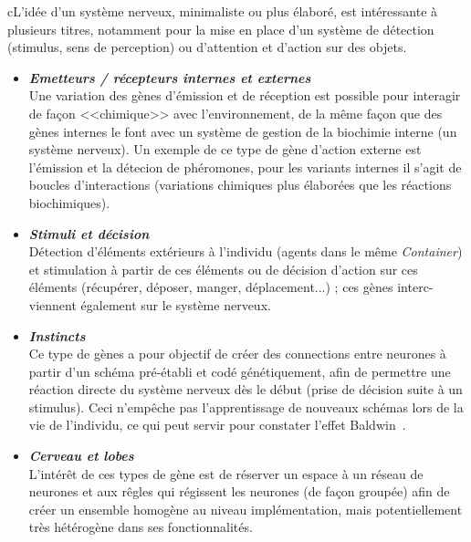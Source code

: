 \documentclass[11pt,twoside,a4paper]{article}
\begin{document}
cL'id{\'e}e d'un syst{\`e}me nerveux, minimaliste ou plus {\'e}labor{\'e}, est int{\'e}ressante {\`a} plusieurs titres, notamment pour la mise en place d'un syst{\`e}me de d{\'e}tection (stimulus, sens de perception) ou d'attention et d'action sur des objets. 
	\begin{itemize}
		\item \textbf{\emph{Emetteurs / r{\'e}cepteurs internes et externes}}~\\
Une variation des g{\`e}nes d'{\'e}mission et de r{\'e}ception est possible pour interagir de fa\c{c}on <<chimique>> avec l'environnement, de la m{\^e}me fa\c{c}on que des g{\`e}nes internes le font avec un syst{\`e}me de gestion de la biochimie interne (un syst{\`e}me nerveux). Un exemple de ce type de g{\`e}ne d'action externe est l'{\'e}mission et la d{\'e}tecion de ph{\'e}romones, pour les variants internes il s'agit de boucles d'interactions (variations chimiques plus {\'e}labor{\'e}es que les r{\'e}actions biochimiques). 
		\item \textbf{\emph{Stimuli et d{\'e}cision}}~\\
D{\'e}tection d'{\'e}l{\'e}ments ext{\'e}rieurs {\`a} l'individu (agents dans le m{\^e}me \emph{Container}) et stimulation {\`a} partir de ces {\'e}l{\'e}ments ou de d{\'e}cision d'action sur ces {\'e}l{\'e}ments (r{\'e}cup{\'e}rer, d{\'e}poser, manger, d{\'e}placement...) ; ces g{\`e}nes interc-viennent {\'e}galement sur le syst{\`e}me nerveux. 
		\item \textbf{\emph{Instincts}}~\\
Ce type de g{\`e}nes a pour objectif de cr{\'e}er des connections entre neurones {\`a} partir d'un sch{\'e}ma pr{\'e}-{\'e}tabli et cod{\'e} g{\'e}n{\'e}tiquement, afin de permettre une r{\'e}action directe du syst{\`e}me nerveux d{\`e}s le d{\'e}but (prise de d{\'e}cision suite {\`a} un stimulus). Ceci n'emp{\^e}che pas l'apprentissage de nouveaux sch{\'e}mas lors de la vie de l'individu, ce qui peut servir pour constater l'effet Baldwin~\cite{baldwin1896}. 
		\item \textbf{\emph{Cerveau et lobes}}~\\
L'int{\'e}r{\^e}t de ces types de g{\`e}ne est de r{\'e}server un espace {\`a} un r{\'e}seau de neurones et aux r{\^e}gles qui r{\'e}gissent les neurones (de fa\c{c}on group{\'e}e) afin de cr{\'e}er un ensemble homog{\`e}ne au niveau impl{\'e}mentation, mais potentiellement tr{\`e}s h{\'e}t{\'e}rog{\`e}ne dans ses fonctionnalit{\'e}s. 
	\end{itemize}
\end{document}
